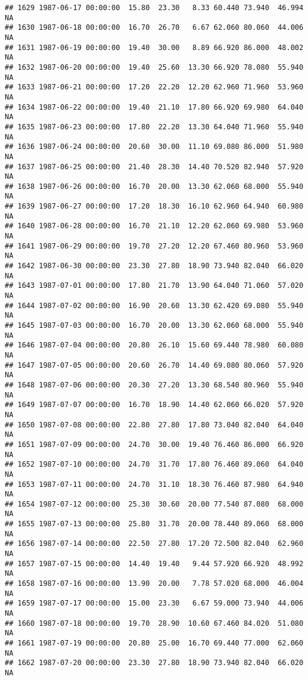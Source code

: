 \documentclass{article}\usepackage{graphicx, color}
\makeatletter
\newenvironment{kframe}{%
 \def\at@end@of@kframe{}%
 \ifinner\ifhmode%
  \def\at@end@of@kframe{\end{minipage}}%
  \begin{minipage}{\columnwidth}%
 \fi\fi%
 \def\FrameCommand##1{\hskip\@totalleftmargin \hskip-\fboxsep
 \colorbox{shadecolor}{##1}\hskip-\fboxsep
     \hskip-\linewidth \hskip-\@totalleftmargin \hskip\columnwidth}%
 \MakeFramed {\advance\hsize-\width
   \@totalleftmargin\z@ \linewidth\hsize
   \@setminipage}}%
 {\par\unskip\endMakeFramed%
 \at@end@of@kframe}
\newenvironment{knitrout}{}{} %
\makeatother
\begin{document}
\begin{knitrout}
\begin{kframe}
\begin{verbatim}
## 1629 1987-06-17 00:00:00  15.80  23.30   8.33 60.440 73.940  46.994     NA
## 1630 1987-06-18 00:00:00  16.70  26.70   6.67 62.060 80.060  44.006     NA
## 1631 1987-06-19 00:00:00  19.40  30.00   8.89 66.920 86.000  48.002     NA
## 1632 1987-06-20 00:00:00  19.40  25.60  13.30 66.920 78.080  55.940     NA
## 1633 1987-06-21 00:00:00  17.20  22.20  12.20 62.960 71.960  53.960     NA
## 1634 1987-06-22 00:00:00  19.40  21.10  17.80 66.920 69.980  64.040     NA
## 1635 1987-06-23 00:00:00  17.80  22.20  13.30 64.040 71.960  55.940     NA
## 1636 1987-06-24 00:00:00  20.60  30.00  11.10 69.080 86.000  51.980     NA
## 1637 1987-06-25 00:00:00  21.40  28.30  14.40 70.520 82.940  57.920     NA
## 1638 1987-06-26 00:00:00  16.70  20.00  13.30 62.060 68.000  55.940     NA
## 1639 1987-06-27 00:00:00  17.20  18.30  16.10 62.960 64.940  60.980     NA
## 1640 1987-06-28 00:00:00  16.70  21.10  12.20 62.060 69.980  53.960     NA
## 1641 1987-06-29 00:00:00  19.70  27.20  12.20 67.460 80.960  53.960     NA
## 1642 1987-06-30 00:00:00  23.30  27.80  18.90 73.940 82.040  66.020     NA
## 1643 1987-07-01 00:00:00  17.80  21.70  13.90 64.040 71.060  57.020     NA
## 1644 1987-07-02 00:00:00  16.90  20.60  13.30 62.420 69.080  55.940     NA
## 1645 1987-07-03 00:00:00  16.70  20.00  13.30 62.060 68.000  55.940     NA
## 1646 1987-07-04 00:00:00  20.80  26.10  15.60 69.440 78.980  60.080     NA
## 1647 1987-07-05 00:00:00  20.60  26.70  14.40 69.080 80.060  57.920     NA
## 1648 1987-07-06 00:00:00  20.30  27.20  13.30 68.540 80.960  55.940     NA
## 1649 1987-07-07 00:00:00  16.70  18.90  14.40 62.060 66.020  57.920     NA
## 1650 1987-07-08 00:00:00  22.80  27.80  17.80 73.040 82.040  64.040     NA
## 1651 1987-07-09 00:00:00  24.70  30.00  19.40 76.460 86.000  66.920     NA
## 1652 1987-07-10 00:00:00  24.70  31.70  17.80 76.460 89.060  64.040     NA
## 1653 1987-07-11 00:00:00  24.70  31.10  18.30 76.460 87.980  64.940     NA
## 1654 1987-07-12 00:00:00  25.30  30.60  20.00 77.540 87.080  68.000     NA
## 1655 1987-07-13 00:00:00  25.80  31.70  20.00 78.440 89.060  68.000     NA
## 1656 1987-07-14 00:00:00  22.50  27.80  17.20 72.500 82.040  62.960     NA
## 1657 1987-07-15 00:00:00  14.40  19.40   9.44 57.920 66.920  48.992     NA
## 1658 1987-07-16 00:00:00  13.90  20.00   7.78 57.020 68.000  46.004     NA
## 1659 1987-07-17 00:00:00  15.00  23.30   6.67 59.000 73.940  44.006     NA
## 1660 1987-07-18 00:00:00  19.70  28.90  10.60 67.460 84.020  51.080     NA
## 1661 1987-07-19 00:00:00  20.80  25.00  16.70 69.440 77.000  62.060     NA
## 1662 1987-07-20 00:00:00  23.30  27.80  18.90 73.940 82.040  66.020     NA

\end{verbatim}
\end{kframe}
\end{knitrout}
\end{document}

